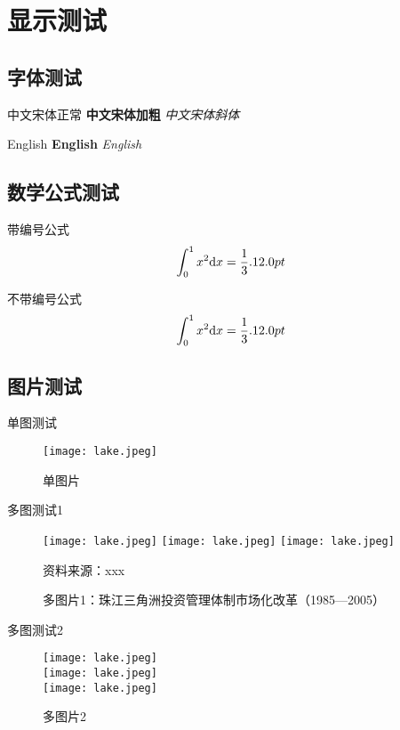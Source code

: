 \chapter{显示测试 \the\baselineskip}
\the\baselineskip
\section{字体测试\the\baselineskip}
中文宋体正常 \textbf{中文宋体加粗} \textit{中文宋体斜体}\the\baselineskip

English \textbf{English} \textit{English}\the\baselineskip
\section{数学公式测试\the\baselineskip}
带编号公式\the\baselineskip
\begin{equation}
    \int_0^1 x^2 \mathrm{d}x = \frac{1}{3}.\the\baselineskip
\end{equation}

不带编号公式\the\baselineskip
\begin{equation*}
    \int_0^1 x^2 \mathrm{d}x = \frac{1}{3}.\the\baselineskip
\end{equation*}

\section{图片测试}
单图测试\the\baselineskip
\begin{figure}[h]
    \centering
    \texttt{[image: lake.jpeg]}
    \caption{单图片\the\baselineskip}
    \label{fig:singlePic}
\end{figure}

多图测试1
\begin{figure}[h]
    \centering
    \texttt{[image: lake.jpeg]}\hfill
    \texttt{[image: lake.jpeg]}\hfill
    \texttt{[image: lake.jpeg]}
    \caption{多图片1：珠江三角洲投资管理体制市场化改革（1985---2005）\the\baselineskip}
    { 资料来源：xxx\the\baselineskip}
    \label{fig:MultiPic1}
\end{figure}

多图测试2
\begin{figure}[h]
    \centering
    \texttt{[image: lake.jpeg]}\\
    \texttt{[image: lake.jpeg]}\\
    \texttt{[image: lake.jpeg]}
    \caption{多图片2}
    \label{fig:MultiPic2}
\end{figure}
